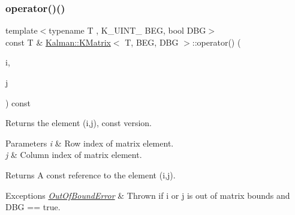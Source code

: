 \subsubsection{\texorpdfstring{operator()()}{operator()()}\hspace{0.1cm}{\footnotesize\ttfamily [2/2]}}
{\footnotesize\ttfamily template$<$typename T , K\+\_\+\+U\+I\+N\+T\+\_ B\+EG, bool D\+BG$>$ \\
const T \& \mbox{\hyperlink{classKalman_1_1KMatrix}{Kalman\+::\+K\+Matrix}}$<$ T, B\+EG, D\+BG $>$\+::operator() (\begin{DoxyParamCaption}\item[{\mbox{\hyperlink{namespaceKalman_a628a50cae10f6e2035393d4f96c698bd}{K\+\_\+\+U\+I\+N\+T\+\_\+32}}}]{i,  }\item[{\mbox{\hyperlink{namespaceKalman_a628a50cae10f6e2035393d4f96c698bd}{K\+\_\+\+U\+I\+N\+T\+\_\+32}}}]{j }\end{DoxyParamCaption}) const\hspace{0.3cm}{\ttfamily [inline]}}



Returns the element {\ttfamily (i,j)}, {\ttfamily const} version. 


\begin{DoxyParams}{Parameters}
{\em i} & Row index of matrix element. \\
\hline
{\em j} & Column index of matrix element. \\
\hline
\end{DoxyParams}
\begin{DoxyReturn}{Returns}
A {\ttfamily const} reference to the element {\ttfamily (i,j)}. 
\end{DoxyReturn}

\begin{DoxyExceptions}{Exceptions}
{\em \mbox{\hyperlink{structKalman_1_1OutOfBoundError}{Out\+Of\+Bound\+Error}}} & Thrown if {\ttfamily i} or {\ttfamily j} is out of matrix bounds and {\ttfamily D\+BG == true}. \\
\hline
\end{DoxyExceptions}
\mbox{\label{classKalman_1_1KMatrix_ae8c66e919d8da3b058faaeece6ba7817}} 
